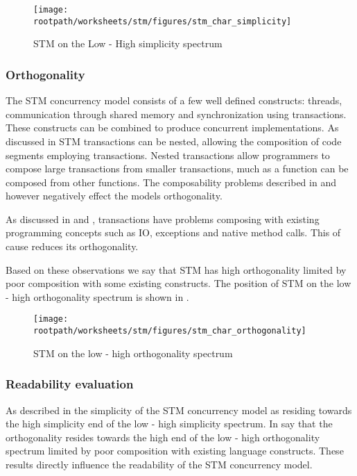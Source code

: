\begin{figure}[htbp]
\centering
 \texttt{[image: \\rootpath/worksheets/stm/figures/stm\_char\_simplicity]} 
 \caption{\ac{STM} on the Low - High simplicity spectrum}
\label{fig:stm_char_simplicity}
\end{figure}

\subsubsection{Orthogonality}\label{sec:stm_orthogonality}
\label{subsec:stm_orthogonality}
The \ac{STM} concurrency model consists of a few well defined constructs: threads, communication through shared memory and synchronization using transactions. These constructs can be combined to produce concurrent implementations. As discussed in  \ac{STM} transactions can be nested, allowing the composition of code segments employing transactions. Nested transactions allow programmers to compose large transactions from smaller transactions, much as a function can be composed from other functions. The composability problems described in  and  however negatively effect the models orthogonality.

As discussed in  and , transactions have problems composing with existing programming concepts such as \ac{IO}, exceptions and native method calls. This of cause reduces its orthogonality.


Based on these observations we say that \ac{STM} has high orthogonality limited by poor composition with some existing constructs. The position of \ac{STM} on the low - high orthogonality spectrum is shown in .

\begin{figure}[htbp]
\centering
 \texttt{[image: \\rootpath/worksheets/stm/figures/stm\_char\_orthogonality]} 
 \caption{\ac{STM} on the low - high orthogonality spectrum}
\label{fig:char_stm_orthogonality}
\end{figure}

\subsubsection{Readability evaluation}
As described in  the simplicity of the \ac{STM} concurrency model as residing towards the high simplicity end of the low - high simplicity spectrum. In  say that the orthogonality resides towards the high end of the low - high orthogonality spectrum limited by poor composition with existing language constructs. These results directly influence the readability of the \ac{STM} concurrency model.

